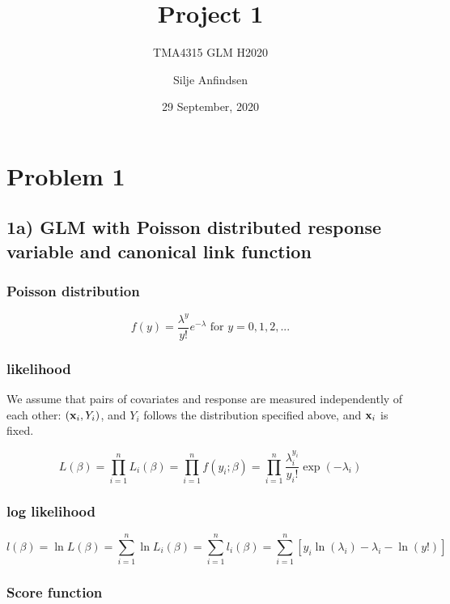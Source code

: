 \documentclass[
]{article}
\title{Project 1}
\subtitle{TMA4315 GLM H2020}
\author{Silje Anfindsen}
\date{29 September, 2020}
\begin{document}
\maketitle

\hypertarget{problem-1}{%
\section{Problem 1}\label{problem-1}}

\hypertarget{a-glm-with-poisson-distributed-response-variable-and-canonical-link-function}{%
\subsection{1a) GLM with Poisson distributed response variable and
canonical link
function}\label{a-glm-with-poisson-distributed-response-variable-and-canonical-link-function}}

\hypertarget{poisson-distribution}{%
\subsubsection{Poisson distribution}\label{poisson-distribution}}

\[
f(y)=\frac{\lambda^y}{y!}e^{-\lambda} \text{ for } y=0,1,2,...
\]

\hypertarget{likelihood}{%
\subsubsection{likelihood}\label{likelihood}}

We assume that pairs of covariates and response are measured
independently of each other: \(({\bf x}_i,Y_i)\), and \(Y_i\) follows
the distribution specified above, and \({\bf x}_i\) is fixed.

\[L(\beta)=\prod_{i=1}^n L_i(\beta)=\prod_{i=1}^n f(y_i; \beta)=\prod_{i=1}^n\frac{\lambda_i^{y_i}}{y_i!}\exp(-\lambda_i)\]

\hypertarget{log-likelihood}{%
\subsubsection{log likelihood}\label{log-likelihood}}

\[l(\beta)=\ln L(\beta)=\sum_{i=1}^n \ln L_i(\beta)=\sum_{i=1}^n l_i(\beta)=\sum_{i=1}^n [y_i \ln(\lambda_i)-\lambda_i-\ln(y!)]\]

\hypertarget{score-function}{%
\subsubsection{Score function}\label{score-function}}
\end{document}
